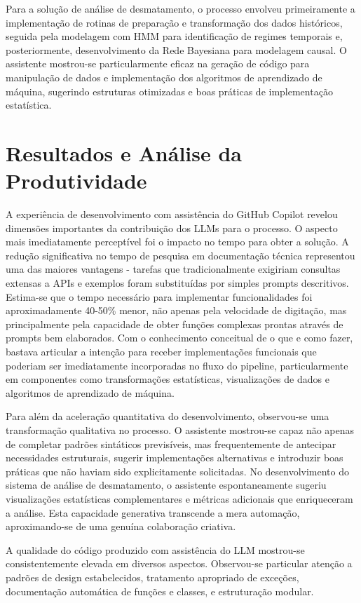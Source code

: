\documentclass[12pt,a4paper]{article}
\begin{document}
Para a solução de análise de desmatamento, o processo envolveu primeiramente a implementação de rotinas de preparação e transformação dos dados históricos, seguida pela modelagem com HMM para identificação de regimes temporais e, posteriormente, desenvolvimento da Rede Bayesiana para modelagem causal. O assistente mostrou-se particularmente eficaz na geração de código para manipulação de dados e implementação dos algoritmos de aprendizado de máquina, sugerindo estruturas otimizadas e boas práticas de implementação estatística.

\section{Resultados e Análise da Produtividade}

A experiência de desenvolvimento com assistência do GitHub Copilot revelou dimensões
importantes da contribuição dos LLMs para o processo. O aspecto mais imediatamente perceptível foi o impacto no tempo para obter a solução. A redução significativa no tempo de pesquisa em documentação técnica representou uma das maiores vantagens - tarefas que tradicionalmente exigiriam consultas extensas a APIs e exemplos foram substituídas por simples prompts descritivos. Estima-se que o tempo necessário para implementar funcionalidades foi aproximadamente 40-50\% menor, não apenas pela velocidade de digitação, mas principalmente pela capacidade de obter funções complexas prontas através de prompts bem elaborados. Com o conhecimento conceitual de o que e como fazer, bastava articular a intenção para receber implementações funcionais que poderiam ser imediatamente incorporadas no fluxo do pipeline, particularmente em componentes como transformações estatísticas, visualizações de dados e algoritmos de aprendizado de máquina.

Para além da aceleração quantitativa do desenvolvimento, observou-se uma transformação qualitativa no processo. O assistente mostrou-se capaz não apenas de completar padrões sintáticos previsíveis, mas frequentemente de antecipar necessidades estruturais, sugerir implementações alternativas e introduzir boas práticas que não haviam sido explicitamente solicitadas. No desenvolvimento do sistema de análise de desmatamento, o assistente espontaneamente sugeriu visualizações estatísticas complementares e métricas adicionais que enriqueceram a análise. Esta capacidade generativa transcende a mera automação, aproximando-se de uma genuína colaboração criativa.

A qualidade do código produzido com assistência do LLM mostrou-se consistentemente elevada em diversos aspectos. Observou-se particular atenção a padrões de design estabelecidos, tratamento apropriado de exceções, documentação automática de funções e classes, e estruturação modular. 
\end{document}
